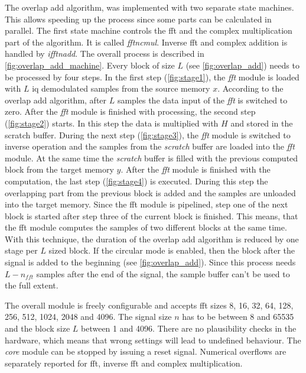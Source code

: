 \documentclass[12pt,a4paper,parskip=full,abstract=true,BCOR=12mm,twoside,open=right]{scrreprt}
\def\device#1{\textit{#1}}
\begin{document}
The overlap add algorithm, was implemented with two separate state machines.
This allows speeding up the process since some parts can be calculated in parallel.
The first state machine controls the \gls{fft} and the complex multiplication part of the
algorithm. It is called \device{fftncmul}. Inverse \gls{fft} and complex
addition is handled by \device{ifftnadd}. The overall process is described in
\cref{fig:overlap_add_machine}. Every block of size $L$ (see \cref{fig:overlap_add})
needs to be processed by four steps. In the first step (\cref{fig:stage1}),
the \device{fft} module is loaded with $L$ \gls{iq} demodulated samples from the source memory $x$. According to
the overlap add algorithm, after $L$ samples the data input of the \device{fft}
is switched to zero. After the \device{fft} module is finished with processing,
the second step (\cref{fig:stage2}) starts. In this step the data is multiplied
with $H$ and stored in the scratch buffer. During the next step (\cref{fig:stage3}),
the \device{fft} module is switched to inverse operation and the samples from the
\device{scratch} buffer are loaded into the \device{fft} module. At the same time
the \device{scratch} buffer is filled with the previous computed block from the target
memory $y$. After the \device{fft} module is finished with the computation, the last step (\cref{fig:stage4})
is executed. During this step the overlapping part from the previous block is added and
the samples are unloaded into the target memory. Since the \gls{fft}
module is pipelined, step one of the next block is started after step three
of the current block is finished. This means, that the \gls{fft} module computes
the samples of two different blocks at the same time. With this technique, the
duration of the overlap add algorithm is reduced by one stage per $L$ sized block.
If the circular mode is enabled, then the block after the signal is added to the
beginning (see \cref{fig:overlap_add}). Since this process needs $L - n_{fft}$ samples
after the end of the signal, the sample buffer can't be used to the full extent.

The overall module is freely configurable and accepts \gls{fft} sizes 8, 16,
32, 64, 128, 256, 512, 1024, 2048 and 4096. The signal size $n$ has to be between
8 and 65535 and the block size $L$ between 1 and 4096. There are no plausibility
checks in the hardware, which means that wrong settings will lead to undefined
behaviour. The \device{core} module can be stopped by issuing a reset signal.
Numerical overflows are separately reported for \gls{fft}, inverse \gls{fft}
and complex multiplication.
\end{document}
